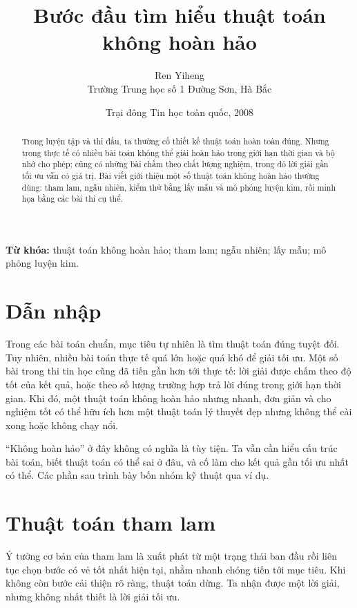 \documentclass[11pt]{article}
\title{Bước đầu tìm hiểu thuật toán không hoàn hảo}
\author{Ren Yiheng\\Trường Trung học số 1 Đường Sơn, Hà Bắc}
\date{Trại đông Tin học toàn quốc, 2008}
\begin{document}
\maketitle


\renewcommand{\abstractname}{Tóm tắt}
\begin{abstract}
Trong luyện tập và thi đấu, ta thường cố thiết kế thuật toán hoàn toàn đúng.
Nhưng trong thực tế có nhiều bài toán không thể giải hoàn hảo trong giới hạn
thời gian và bộ nhớ cho phép; cũng có những bài chấm theo chất lượng nghiệm,
trong đó lời giải gần tối ưu vẫn có giá trị. Bài viết giới thiệu một số thuật
toán không hoàn hảo thường dùng: tham lam, ngẫu nhiên, kiểm thử bằng lấy mẫu
và mô phỏng luyện kim, rồi minh họa bằng các bài thi cụ thể.
\end{abstract}

\noindent\textbf{Từ khóa:} thuật toán không hoàn hảo; tham lam; ngẫu nhiên;
lấy mẫu; mô phỏng luyện kim.

\section{Dẫn nhập}

Trong các bài toán chuẩn, mục tiêu tự nhiên là tìm thuật toán đúng tuyệt đối.
Tuy nhiên, nhiều bài toán thực tế quá lớn hoặc quá khó để giải tối ưu. Một số
bài trong thi tin học cũng đã tiến gần hơn tới thực tế: lời giải được chấm
theo độ tốt của kết quả, hoặc theo số lượng trường hợp trả lời đúng trong giới
hạn thời gian. Khi đó, một thuật toán không hoàn hảo nhưng nhanh, đơn giản và
cho nghiệm tốt có thể hữu ích hơn một thuật toán lý thuyết đẹp nhưng không
thể cài xong hoặc không chạy nổi.

``Không hoàn hảo'' ở đây không có nghĩa là tùy tiện. Ta vẫn cần hiểu cấu trúc
bài toán, biết thuật toán có thể sai ở đâu, và cố làm cho kết quả gần tối ưu
nhất có thể. Các phần sau trình bày bốn nhóm kỹ thuật qua ví dụ.

\section{Thuật toán tham lam}

Ý tưởng cơ bản của tham lam là xuất phát từ một trạng thái ban đầu rồi liên
tục chọn bước có vẻ tốt nhất hiện tại, nhằm nhanh chóng tiến tới mục tiêu. Khi
không còn bước cải thiện rõ ràng, thuật toán dừng. Ta nhận được một lời giải,
nhưng không nhất thiết là lời giải tối ưu.
\end{document}
